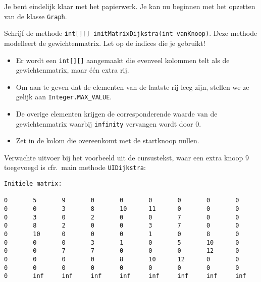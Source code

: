 \begin{oef}
\code Je bent eindelijk klaar met het papierwerk. Je kan nu beginnen met het opzetten van de klasse \verb/Graph/.

Schrijf de methode \verb/int[][] initMatrixDijkstra(int vanKnoop)/. Deze methode modelleert de gewichtenmatrix. Let op de indices die je gebruikt!
\begin{itemize}
\item Er wordt een \verb/int[][]/ aangemaakt die evenveel kolommen telt als de gewichtenmatrix, maar één extra rij.
\item Om aan te geven dat de elementen van de laatste rij leeg zijn, stellen we ze gelijk aan \verb/Integer.MAX_VALUE/. 
\item De overige elementen krijgen de corresponderende waarde van de gewichtenmatrix waarbij \verb/infinity/ vervangen wordt door 0.
\item Zet in de kolom die overeenkomt met de startknoop nullen. 
\end{itemize}

Verwachte uitvoer bij het voorbeeld uit de cursustekst, waar een extra knoop $9$ toegevoegd is cfr.\ main methode \verb/UIDijkstra/:
\begin{lstlisting}
Initiele matrix: 

0      	5      	9      	0      	0      	0      	0      	0      	0	
0      	0      	3      	8      	10     	11     	0      	0      	0	
0      	3      	0      	2      	0      	0      	7      	0      	0	
0      	8      	2      	0      	0      	3       7      	0      	0	
0      	10     	0      	0      	0      	1      	0      	8      	0	
0      	0      	0      	3      	1      	0      	5      	10      0	
0      	0      	7      	7      	0      	0      	0      	12     	0	
0      	0      	0       0      	8      	10     	12    	0      	0	
0      	0      	0      	0      	0      	0      	0      	0      	0	
0      	inf    	inf   	inf   	inf   	inf   	inf   	inf   	inf	
\end{lstlisting}
\end{oef}

